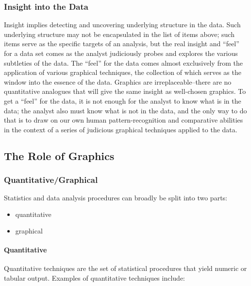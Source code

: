 \documentclass[]{book}
\providecommand{\tightlist}{%
  \setlength{\itemsep}{0pt}\setlength{\parskip}{0pt}}
\let\oldparagraph\paragraph
\renewcommand{\paragraph}[1]{\oldparagraph{#1}\mbox{}}
\theoremstyle{definition}
\theoremstyle{definition}
\theoremstyle{definition}
\theoremstyle{remark}
\begin{document}
\subsubsection{Insight into the Data}\label{insight-into-the-data}

Insight implies detecting and uncovering underlying structure in the
data. Such underlying structure may not be encapsulated in the list of
items above; such items serve as the specific targets of an analysis,
but the real insight and ``feel'' for a data set comes as the analyst
judiciously probes and explores the various subtleties of the data. The
``feel'' for the data comes almost exclusively from the application of
various graphical techniques, the collection of which serves as the
window into the essence of the data. Graphics are irreplaceable--there
are no quantitative analogues that will give the same insight as
well-chosen graphics. To get a ``feel'' for the data, it is not enough
for the analyst to know what is in the data; the analyst also must know
what is not in the data, and the only way to do that is to draw on our
own human pattern-recognition and comparative abilities in the context
of a series of judicious graphical techniques applied to the data.

\subsection{The Role of Graphics}\label{the-role-of-graphics}

\subsubsection{Quantitative/Graphical}\label{quantitativegraphical}

Statistics and data analysis procedures can broadly be split into two
parts:

\begin{itemize}
\tightlist
\item
  quantitative
\item
  graphical
\end{itemize}

\paragraph{Quantitative}\label{quantitative}

Quantitative techniques are the set of statistical procedures that yield
numeric or tabular output. Examples of quantitative techniques include:
\end{document}
